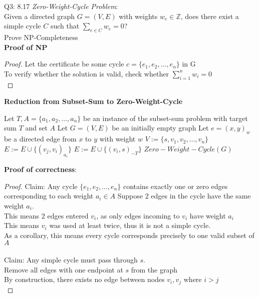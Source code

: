 \begin{problem}
    {Q3: 8.17}
    \textit{Zero-Weight-Cycle Problem}: \\
    Given a directed graph $G = (V,E)$ with weights $w_e \in \mathbb{Z}$, does there exist a simple cycle $C$ such that $\sum_{e \in C}w_e = 0$? \\
    Prove NP-Completeness \\
    \textbf{Proof of NP}
    \begin{proof}
        Let the certificate be some cycle $c = \{e_1, e_2, \dots, e_n\}$ in G \\
        To verify whether the solution is valid, check whether $\sum_{i = 1}^{n}w_i = 0$ \\
    \end{proof}
    \textbf{Reduction from Subset-Sum to Zero-Weight-Cycle}
    \begin{algorithmic}[1]
        \STATE Let $T, A = \{a_1, a_2, \dots, a_n\}$ be an instance of the subset-sum problem with target sum $T$ and set $A$
        \STATE Let $G = (V, E)$ be an initially empty graph
        \STATE Let $e = (x, y)_w$ be a directed edge from $x$ to $y$ with weight $w$
        \STATE $V := \{s, v_1, v_2, \dots, v_n\}$
                \STATE $E := E \cup \{(v_j, v_i)_{a_i}\}$
            \ENDFOR
            \STATE $E := E \cup \{(v_i, s)_{-T}\}$
        \ENDFOR
        \RETURN $Zero-Weight-Cycle(G)$
    \end{algorithmic}
    \noindent
    \textbf{Proof of correctness}:
    \begin{proof}
        Claim: Any cycle $\{e_1, e_2, \dots, e_n\}$ contains exactly one or zero edges corresponding to each weight $a_i \in A$
        Suppose 2 edges in the cycle have the same weight $a_i$. \\
        This means 2 edges entered $v_i$, as only edges incoming to $v_i$ have weight $a_i$ \\
        This means $v_i$ was used at least twice, thus it is not a simple cycle. \\
        As a corollary, this means every cycle corresponds precisely to one valid subset of $A$ \\\\
        Claim: Any simple cycle must pass through $s$. \\
        Remove all edges with one endpoint at $s$ from the graph \\
        By construction, there exists no edge between nodes $v_i, v_j$ where $i > j$ \\

\end{proof}
\end{problem}
